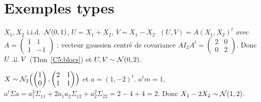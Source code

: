 \documentclass[11pt,a4paper]{article}
\begin{document}
\section*{Exemples types}

\begin{exemple}\label{C5:ex1}
$X_1,X_2$ i.i.d.\ $\mathcal{N}(0,1)$, $U=X_1+X_2$, $V=X_1-X_2$. $(U,V)=A(X_1,X_2)^t$ avec $A=\begin{pmatrix}1&1\\1&-1\end{pmatrix}$ :
vecteur gaussien centré de covariance $AI_2A^t=\begin{pmatrix}2&0\\0&2\end{pmatrix}$. Donc $U\perp\!\!\!\perp V$ (Thm~\ref{C5:blocs}) et
$U,V\sim\mathcal{N}(0,2)$.
\end{exemple}

\begin{exemple}\label{C5:ex2}
$X\sim\mathcal{N}_2\Bigl(\begin{pmatrix}1\\0\end{pmatrix},\begin{pmatrix}2&1\\1&1\end{pmatrix}\Bigr)$ et $a=(1,-2)^t$.
$a^tm=1$, $a^t\Sigma a=a_1^2\Sigma_{11}+2a_1a_2\Sigma_{12}+a_2^2\Sigma_{22}=2-4+4=2$. Donc $X_1-2X_2\sim\mathcal{N}(1,2)$.
\end{exemple}
\end{document}
